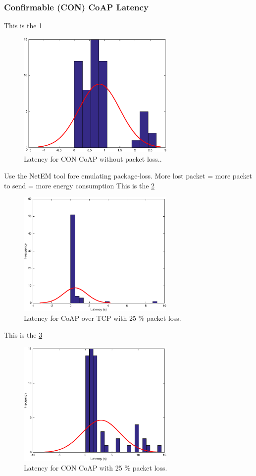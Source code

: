 \subsubsection{Confirmable (CON) CoAP Latency}
This is the \figurename \ref{fig_sim2}
\begin{figure}[bht]
	\centering
	\includegraphics[width=3in]{gfx/coapoverudp}
	\caption{Latency for CON CoAP without packet loss..}
	\label{fig_sim2}
\end{figure}

Use the NetEM tool fore emulating package-loss.
More lost packet = more packet to send = more energy consumption
This is the \figurename \ref{coapovertcploss}
\begin{figure}[bh]
	\centering
	\includegraphics[width=3in]{gfx/coapovertcp25loss}
	\caption{Latency for CoAP over TCP with 25 \% packet loss.}
	\label{coapovertcploss}
\end{figure}

This is the \figurename \ref{coapoverudploss}
\begin{figure}[bh]
	\centering
	\includegraphics[width=3in]{gfx/coapoverudp25loss}
	\caption{Latency for CON CoAP with 25 \% packet loss.}
	\label{coapoverudploss}
\end{figure}

